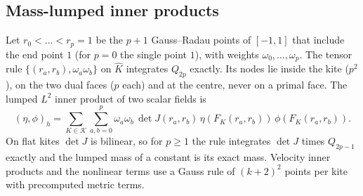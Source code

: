 \documentclass[preprint,12pt]{elsarticle}
\newcommand{\Kc}{\mathcal{K}}
\theoremstyle{definition}
\begin{document}
\subsection{Mass-lumped inner products}\label{sec:quadrature}
Let $r_0<\dots<r_p = 1$ be the $p+1$ Gauss--Radau points of $[-1,1]$ that include the end point $1$
(for $p = 0$ the single point $1$), with weights $\omega_0,\dots,\omega_p$. The tensor rule
$\{(r_a, r_b), \omega_a\omega_b\}$ on $\hat K$ integrates $Q_{2p}$ exactly. Its nodes lie inside the kite
($p^2$), on the two dual faces ($p$ each) and at the centre, never on a primal face. The lumped $L^2$
inner product of two scalar fields is
\begin{equation}\label{eq:lumped}
  (\eta,\phi)_h = \sum_{K\in\Kc}\sum_{a,b=0}^{p}\omega_a\omega_b\,\det J(r_a,r_b)\,\eta(F_K(r_a,r_b))\,
  \phi(F_K(r_a,r_b)).
\end{equation}
On flat kites $\det J$ is bilinear, so for $p\ge1$ the rule integrates $\det J$ times $Q_{2p-1}$ exactly
and the lumped mass of a constant is its exact mass. Velocity inner products and the nonlinear terms use a
Gauss rule of $(k+2)^2$ points per kite with precomputed metric terms.
\end{document}
